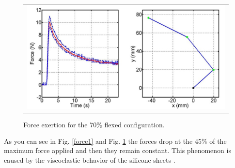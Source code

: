 \begin{figure}[h!]
\begin{center}
\begin{tabular}{  c  }
\includegraphics[width=12cm]{figures/Intro/Fig1-6.jpg}
\end{tabular}
\end{center}
\caption{Force exertion for the 70\% flexed configuration.} 
\label{force2}
\end{figure}

As you can see  in Fig. \ref{force1} and Fig. \ref{force2} the forces drop at the 45\% of the maximum force applied and then they remain constant. This phenomenon is caused by the viscoelastic behavior of the silicone sheets \cite{DollarThesis}. \\

\newpage

